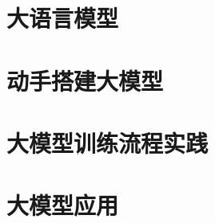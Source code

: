 \documentclass[12pt,a4paper]{book}
\begin{document}
\chapter{大语言模型}


\chapter{动手搭建大模型}


\chapter{大模型训练流程实践}


\chapter{大模型应用}


%     
\end{document}

